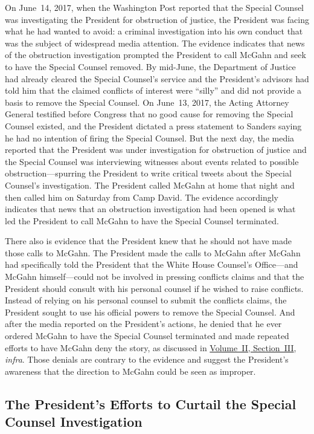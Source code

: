 On June~14, 2017, when the Washington Post reported that the Special Counsel was investigating the President for obstruction of justice, the President was facing what he had wanted to avoid: a criminal investigation into his own conduct that was the subject of widespread media attention.
The evidence indicates that news of the obstruction investigation prompted the President to call McGahn and seek to have the Special Counsel removed.
By mid-June, the Department of Justice had already cleared the Special Counsel's service and the President's advisors had told him that the claimed conflicts of interest were ``silly'' and did not provide a basis to remove the Special Counsel.
On June~13, 2017, the Acting Attorney General testified before Congress that no good cause for removing the Special Counsel existed, and the President dictated a press statement to Sanders saying he had no intention of firing the Special Counsel.
But the next day, the media reported that the President was under investigation for obstruction of justice and the Special Counsel was interviewing witnesses about events related to possible obstruction---spurring the President to write critical tweets about the Special Counsel's investigation.
The President called McGahn at home that night and then called him on Saturday from Camp David.
The evidence accordingly indicates that news that an obstruction investigation had been opened is what led the President to call McGahn to have the Special Counsel terminated.

There also is evidence that the President knew that he should not have made those calls to McGahn.
The President made the calls to McGahn after McGahn had specifically told the President that the White House Counsel's Office---and McGahn himself---could not be involved in pressing conflicts claims and that the President should consult with his personal counsel if he wished to raise conflicts.
Instead of relying on his personal counsel to submit the conflicts claims, the President sought to use his official powers to remove the Special Counsel.
And after the media reported on the President's actions, he denied that he ever ordered McGahn to have the Special Counsel terminated and made repeated efforts to have McGahn deny the story, as discussed in \hyperlink{section.2.3}{Volume~II, Section~III}, \textit{infra}.
Those denials are contrary to the evidence and suggest the President's awareness that the direction to McGahn could be seen as improper.

\subsection{The President's Efforts to Curtail the Special Counsel Investigation}

